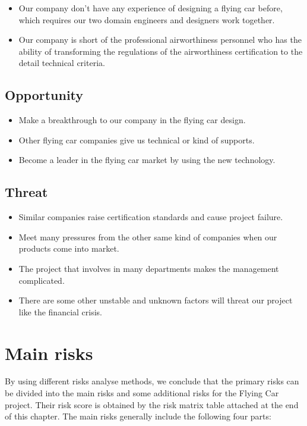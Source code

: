 \begin{itemize}
\item Our company don’t have any experience of designing a flying car before, which requires our two domain engineers and designers work together.
\item Our company is short of the professional airworthiness personnel who has the ability of  transforming the regulations of the airworthiness certification to the detail technical criteria.
\end{itemize}

\subsection{Opportunity}

\begin{itemize}
\item Make a breakthrough to our company in the flying car design.
\item Other flying car companies give us technical or kind of supports.
\item Become a leader in the flying car market by using the new technology.
\end{itemize}

\subsection{Threat}

\begin{itemize}
\item Similar companies raise certification standards and cause project failure.
\item Meet many pressures from the other same kind of companies when our products come into market.
\item The project that involves in many departments makes the management complicated.
\item There are some other unstable and unknown factors will threat our project like the financial crisis.
\end{itemize}

\section{Main risks}

By using different risks analyse methods, we conclude that the primary risks can be divided into the main risks and some additional risks for the Flying Car project. Their risk score is obtained by the risk matrix table attached at the end of this chapter. The main risks generally include the following four parts:

